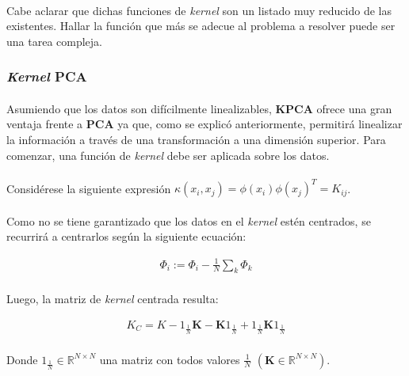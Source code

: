 \documentclass[12pt, twocolumn]{article}
\begin{document}
	\paragraph{} Cabe aclarar que dichas funciones de \textit{kernel} son un listado muy reducido de las existentes. Hallar la función que más se adecue al problema a resolver puede ser una tarea compleja.
	
	\subsubsection{\textit{Kernel} PCA}
	
	\paragraph{} Asumiendo que los datos son difícilmente linealizables, \textbf{KPCA} ofrece una gran ventaja frente a \textbf{PCA} ya que, como se explicó anteriormente, permitirá linealizar la información a través de una transformación a una dimensión superior. Para comenzar, una función de \textit{kernel} debe ser aplicada sobre los datos.
	
	\paragraph{} Considérese la siguiente expresión $\kappa(x_{i},x_{j})=\phi(x_{i})\phi(x_{j})^{T} = K_{ij}$.
	
	\paragraph{} Como no se tiene garantizado que los datos en el \textit{kernel} estén centrados, se recurrirá a centrarlos según la siguiente ecuación:
	
	\begin{align}
		\Phi_{i} := \Phi_{i} - \frac{1}{N}\sum_{k}\Phi_{k}
	\end{align}
	
	\paragraph{} Luego, la matriz de \textit{kernel} centrada resulta:
	
	\begin{align}
		K_{C} = K - 1_{\frac{1}{N}}\mathbf{K} - \mathbf{K}1_{\frac{1}{N}}  + 1_{\frac{1}{N}}\mathbf{K}1_{\frac{1}{N}}
	\end{align}
	
	\paragraph{} Donde $1_{\frac{1}{N}} \in \mathbb{R}^{N \times N}$ una matriz con todos valores $\frac{1}{N}$ $(\mathbf{K} \in \mathbb{R}^{N \times N})$.
	
\end{document}
